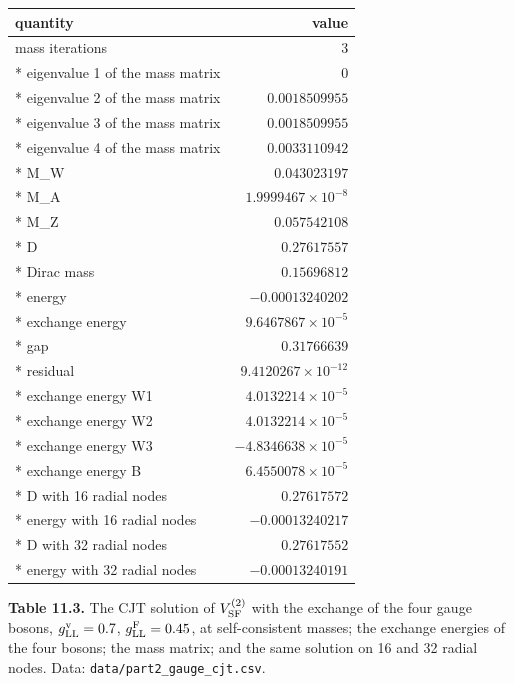 \documentclass[
  10pt,
]{article}
\begin{document}
\begin{longtable}[]{@{}lr@{}}
\toprule\noalign{}
quantity & value \\
\midrule\noalign{}
\endhead
\bottomrule\noalign{}
\endlastfoot
mass iterations & \(3\) \\*
eigenvalue 1 of the mass matrix & \(0\) \\*
eigenvalue 2 of the mass matrix & \(0.0018509955\) \\*
eigenvalue 3 of the mass matrix & \(0.0018509955\) \\*
eigenvalue 4 of the mass matrix & \(0.0033110942\) \\*
M\_W & \(0.043023197\) \\*
M\_A & \(1.9999467\times10^{-8}\) \\*
M\_Z & \(0.057542108\) \\*
D & \(0.27617557\) \\*
Dirac mass & \(0.15696812\) \\*
energy & \(-0.00013240202\) \\*
exchange energy & \(9.6467867\times10^{-5}\) \\*
gap & \(0.31766639\) \\*
residual & \(9.4120267\times10^{-12}\) \\*
exchange energy W1 & \(4.0132214\times10^{-5}\) \\*
exchange energy W2 & \(4.0132214\times10^{-5}\) \\*
exchange energy W3 & \(-4.8346638\times10^{-5}\) \\*
exchange energy B & \(6.4550078\times10^{-5}\) \\*
D with 16 radial nodes & \(0.27617572\) \\*
energy with 16 radial nodes & \(-0.00013240217\) \\*
D with 32 radial nodes & \(0.27617552\) \\*
energy with 32 radial nodes & \(-0.00013240191\) \\
\end{longtable}

\textbf{Table 11.3.} The CJT solution of \(V^{(2)}_{\rm SF}\) with the
exchange of the four gauge bosons, \(g^{\rm v}_{\rm LL}=0.7\),
\(g^{\rm F}_{\rm LL}=0.45\), at self-consistent masses; the exchange
energies of the four bosons; the mass matrix; and the same solution on
16 and 32 radial nodes. Data: \texttt{data/part2\_gauge\_cjt.csv}.
\end{document}
